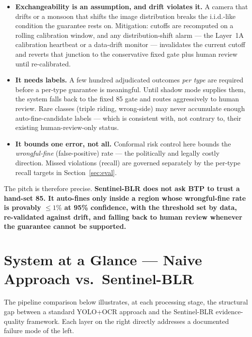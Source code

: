 \documentclass[11pt,a4paper]{article}
\begin{document}
\begin{itemize}[leftmargin=1.8em, itemsep=0.25em]
    \item \textbf{Exchangeability is an assumption, and drift violates it.} A camera that drifts or a monsoon that shifts the image distribution breaks the i.i.d.-like condition the guarantee rests on. Mitigation: cutoffs are recomputed on a rolling calibration window, and any distribution-shift alarm --- the Layer~1A calibration heartbeat or a data-drift monitor --- invalidates the current cutoff and reverts that junction to the conservative fixed gate plus human review until re-calibrated.
    \item \textbf{It needs labels.} A few hundred adjudicated outcomes \emph{per type} are required before a per-type guarantee is meaningful. Until shadow mode supplies them, the system falls back to the fixed 85 gate and routes aggressively to human review. Rare classes (triple riding, wrong-side) may never accumulate enough auto-fine-candidate labels --- which is consistent with, not contrary to, their existing human-review-only status.
    \item \textbf{It bounds one error, not all.} Conformal risk control here bounds the \emph{wrongful-fine} (false-positive) rate --- the politically and legally costly direction. Missed violations (recall) are governed separately by the per-type recall targets in Section~\ref{sec:eval}.
\end{itemize}

\noindent The pitch is therefore precise. \textbf{Sentinel-BLR does not ask BTP to trust a hand-set 85. It auto-fines only inside a region whose wrongful-fine rate is provably $\le 1\%$ at 95\% confidence, with the threshold set by data, re-validated against drift, and falling back to human review whenever the guarantee cannot be supported.}

\section{System at a Glance — Naive Approach vs.\ Sentinel-BLR}
\label{sec:naive-vs-sentinel}

The pipeline comparison below illustrates, at each processing stage, the structural gap between a standard YOLO+OCR approach and the Sentinel-BLR evidence-quality framework. Each layer on the right directly addresses a documented failure mode of the left.
\end{document}
